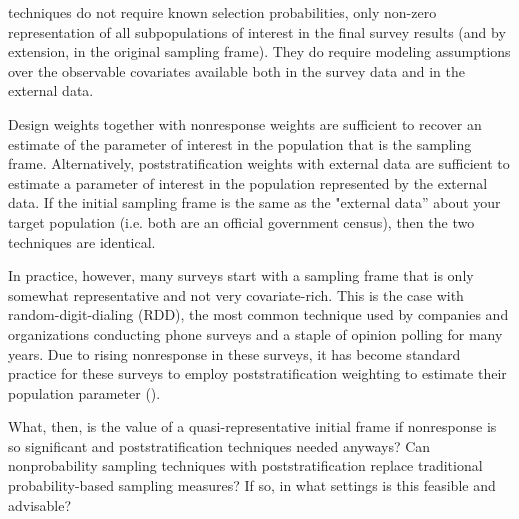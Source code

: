 \documentclass[a4paper,12pt]{article}
\theoremstyle{proposition}
\begin{document}
\begin{enumerate}
techniques do not require known selection probabilities, only non-zero representation of all subpopulations of interest in the final survey results (and by extension, in the original sampling frame). They do require modeling assumptions over the observable covariates available both in the survey data and in the external data.

\end{enumerate}


Design weights together with nonresponse weights are sufficient to recover an estimate of the parameter of interest in the population that is the sampling frame. Alternatively, poststratification weights with external data are sufficient to estimate a parameter of interest in the population represented by the external data. If the initial sampling frame is the same as the "external data'' about your target population (i.e. both are an official government census), then the two techniques are identical.

In practice, however, many surveys start with a sampling frame that is only somewhat representative and not very covariate-rich. This is the case with random-digit-dialing (RDD), the most common technique used by companies and organizations conducting phone surveys and a staple of opinion polling for many years. Due to rising nonresponse in these surveys, it has become standard practice for these surveys to employ poststratification weighting to estimate their population parameter (\cite{Gelman1997}).

What, then, is the value of a quasi-representative initial frame if nonresponse is so significant and poststratification techniques needed anyways? Can nonprobability sampling techniques with poststratification replace traditional probability-based sampling measures? If so, in what settings is this feasible and advisable?
\end{document}
